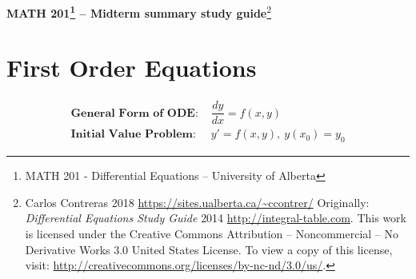 \documentclass[10pt,leqno]{article}
\begin{document}
\pagestyle{empty}
 
\begin{center}
\begin{LARGE}\textbf{MATH 201\footnote{MATH 201 - Differential Equations -- University of Alberta} -- Midterm summary study guide}\footnote{Carlos Contreras {\scriptsize \textcopyleft \hspace{.5ex} 2018 \url{https://sites.ualberta.ca/~ccontrer/}} Originally: \textit{Differential Equations Study Guide} {\scriptsize \textcopyleft \hspace{.5ex} 2014 \hspace{.5ex} \url{http://integral-table.com}. This work is licensed under the Creative Commons Attribution --  Noncommercial -- No Derivative Works 3.0 United States License. To view a copy of this license, visit:  \url{http://creativecommons.org/licenses/by-nc-nd/3.0/us/}.}
 }\end{LARGE}

\section*{First Order Equations}
\begin{minipage}{4in}
\begin{align}
\textbf{General Form of ODE:\ }& \dfrac{dy}{dx}=f(x,y)\\
\textbf{Initial Value Problem:\ }& y'=f(x,y),\ y(x_0) = y_0
\end{align}
\end{minipage}

\end{center}
\vspace{1em}
\end{document}
